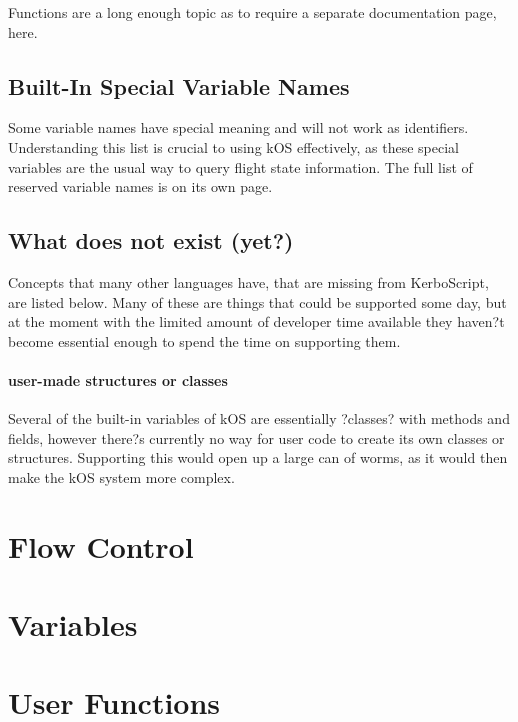 Functions are a long enough topic as to require a separate documentation page, here.

\subsection{Built-In Special Variable Names}
Some variable names have special meaning and will not work as identifiers. Understanding this list is crucial to using kOS effectively, as these special variables are the usual way to query flight state information. The full list of reserved variable names is on its own page.

\subsection{What does not exist (yet?)}
Concepts that many other languages have, that are missing from KerboScript, are listed below. Many of these are things that could be supported some day, but at the moment with the limited amount of developer time available they haven?t become essential enough to spend the time on supporting them.

\paragraph{user-made structures or classes}
Several of the built-in variables of kOS are essentially ?classes? with methods and fields, however there?s currently no way for user code to create its own classes or structures. Supporting this would open up a large can of worms, as it would then make the kOS system more complex.
	\section{Flow Control}
	\section{Variables}
	\section{User Functions}